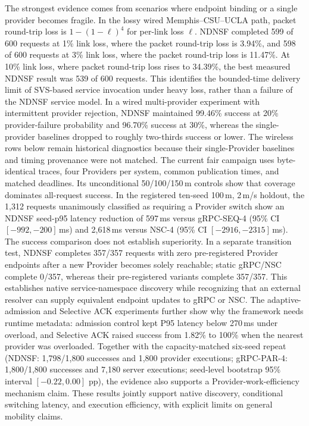 The strongest evidence comes from scenarios where endpoint binding or a single
provider becomes fragile. In the lossy wired Memphis--CSU--UCLA path, packet
round-trip loss is $1-(1-\ell)^4$ for per-link loss $\ell$. NDNSF completed
599 of 600 requests at 1\% link loss, where the packet round-trip loss is
3.94\%, and 598 of 600 requests at 3\% link loss, where the packet round-trip
loss is 11.47\%. At 10\% link loss, where packet round-trip loss rises to
34.39\%, the best measured NDNSF result was 539 of 600 requests. This
identifies the bounded-time delivery limit of SVS-based service invocation
under heavy loss, rather than a failure of the NDNSF service model. In a wired multi-provider
experiment with intermittent provider rejection, NDNSF maintained 99.46\%
success at 20\% provider-failure probability and 96.70\% success at 30\%,
whereas the single-provider baselines dropped to roughly two-thirds success or
lower. The wireless rows below remain historical diagnostics because their
single-Provider baselines and timing provenance were not matched. The current
fair campaign uses byte-identical traces, four Providers per system, common
publication times, and matched deadlines. Its unconditional 50/100/150\,m
controls show that coverage dominates all-request success. In the registered
ten-seed 100\,m, 2\,m/s holdout, the 1,312 requests unanimously classified as
requiring a Provider switch show an NDNSF seed-p95 latency reduction of
597\,ms versus gRPC-SEQ-4 (95\% CI $[-992,-200]$\,ms) and 2,618\,ms versus
NSC-4 (95\% CI $[-2916,-2315]$\,ms). The success comparison does not establish
superiority. In a separate transition test, NDNSF completes 357/357 requests
with zero pre-registered Provider endpoints after a new Provider becomes solely
reachable; static gRPC/NSC complete 0/357, whereas their pre-registered variants
complete 357/357. This establishes native service-namespace discovery while
recognizing that an external resolver can supply equivalent endpoint updates
to gRPC or NSC. The adaptive-admission and Selective ACK
experiments further show why the framework needs runtime metadata: admission
control kept P95 latency below 270\,ms under overload, and Selective ACK raised
success from 1.82\% to 100\% when the nearest provider was overloaded.
Together with the capacity-matched six-seed repeat (NDNSF: 1,798/1,800
successes and 1,800 provider executions; gRPC-PAR-4: 1,800/1,800 successes and
7,180 server executions; seed-level bootstrap 95\% interval $[-0.22,0.00]$ pp),
the evidence also supports a Provider-work-efficiency mechanism claim. These
results jointly support native discovery, conditional switching latency, and
execution efficiency, with explicit limits on general mobility claims.

